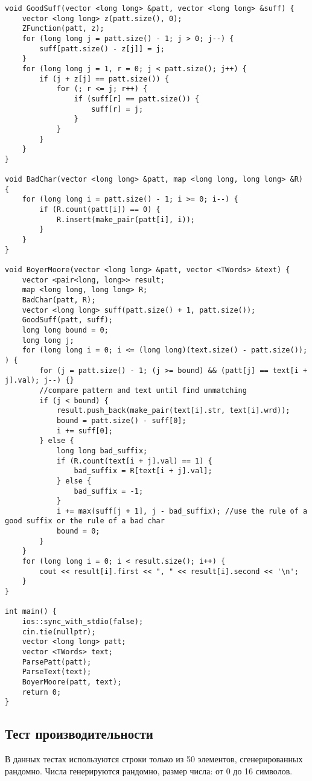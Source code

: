 \documentclass[12pt]{article}
\begin{document}
\begin{verbatim}
void GoodSuff(vector <long long> &patt, vector <long long> &suff) {
    vector <long long> z(patt.size(), 0);
    ZFunction(patt, z);
    for (long long j = patt.size() - 1; j > 0; j--) {
        suff[patt.size() - z[j]] = j;
    }
    for (long long j = 1, r = 0; j < patt.size(); j++) {
        if (j + z[j] == patt.size()) {
            for (; r <= j; r++) {
                if (suff[r] == patt.size()) {
                    suff[r] = j;
                }
            }
        }
    }
}

void BadChar(vector <long long> &patt, map <long long, long long> &R) {
    for (long long i = patt.size() - 1; i >= 0; i--) {
        if (R.count(patt[i]) == 0) {
            R.insert(make_pair(patt[i], i));
        }
    }
}

void BoyerMoore(vector <long long> &patt, vector <TWords> &text) {
    vector <pair<long, long>> result;
    map <long long, long long> R;
    BadChar(patt, R);
    vector <long long> suff(patt.size() + 1, patt.size());
    GoodSuff(patt, suff);
    long long bound = 0;
    long long j;
    for (long long i = 0; i <= (long long)(text.size() - patt.size()); ) {
        for (j = patt.size() - 1; (j >= bound) && (patt[j] == text[i + j].val); j--) {} 
        //compare pattern and text until find unmatching
        if (j < bound) {
            result.push_back(make_pair(text[i].str, text[i].wrd));
            bound = patt.size() - suff[0];
            i += suff[0];
        } else {
            long long bad_suffix;
            if (R.count(text[i + j].val) == 1) {
                bad_suffix = R[text[i + j].val];
            } else {
                bad_suffix = -1;
            }
            i += max(suff[j + 1], j - bad_suffix); //use the rule of a good suffix or the rule of a bad char
            bound = 0;
        }
    }
    for (long long i = 0; i < result.size(); i++) {
        cout << result[i].first << ", " << result[i].second << '\n';
    }
}

int main() {
    ios::sync_with_stdio(false);
    cin.tie(nullptr);
    vector <long long> patt;
    vector <TWords> text;
    ParsePatt(patt);
    ParseText(text);
    BoyerMoore(patt, text);
    return 0;
}
\end{verbatim}

\subsection*{Тест производительности}

В данных тестах используются строки только из 50 элементов, сгенерированных рандомно. Числа генерируются рандомно, размер числа: от 0 до 16 символов. 
\end{document}
